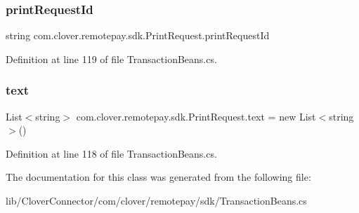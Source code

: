 \subsubsection{\texorpdfstring{print\+Request\+Id}{printRequestId}}
{\footnotesize\ttfamily string com.\+clover.\+remotepay.\+sdk.\+Print\+Request.\+print\+Request\+Id}



Definition at line 119 of file Transaction\+Beans.\+cs.

\mbox{\label{classcom_1_1clover_1_1remotepay_1_1sdk_1_1_print_request_ad10de4093d7e4f95539de84ba1ada767}} 
\subsubsection{\texorpdfstring{text}{text}}
{\footnotesize\ttfamily List$<$string$>$ com.\+clover.\+remotepay.\+sdk.\+Print\+Request.\+text = new List$<$string$>$()}



Definition at line 118 of file Transaction\+Beans.\+cs.



The documentation for this class was generated from the following file\+:\begin{DoxyCompactItemize}
\item 
lib/\+Clover\+Connector/com/clover/remotepay/sdk/Transaction\+Beans.\+cs\end{DoxyCompactItemize}
